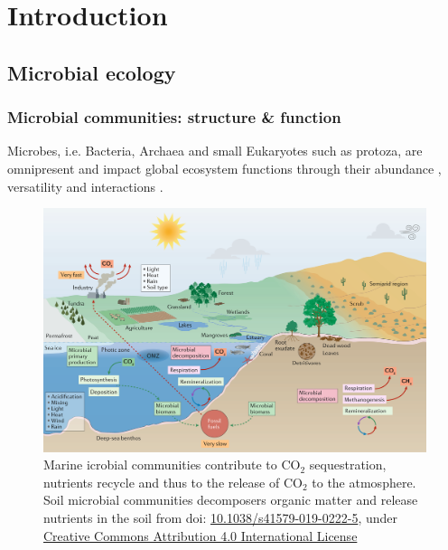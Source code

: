 \chapter{Introduction}
\label{cha:intro}


\section{Microbial ecology}

\subsection{Microbial communities: structure \& function}

   Microbes, i.e. Bacteria, Archaea and small Eukaryotes such as protoza, are omnipresent and impact global ecosystem functions \citep{falkowski2008microbial} through their abundance \citep{bar2018biomass}, versatility \citep{rees2017improving} and interactions \citep{rottjers2018hairballs}. 



   \begin{figure}[h]
      \centering
      \includegraphics[width=135mm]{figures/ecosystem_functioning.png}
      \caption{Marine icrobial communities contribute to CO$_2$ sequestration, nutrients recycle and thus to the release of CO$_2$ to the atmosphere. 
      Soil microbial communities decomposers organic matter and release nutrients in the soil 
      from \citep{cavicchioli2019scientists} doi: \href{https://doi.org/10.1038/s41579-019-0222-5}{10.1038/s41579-019-0222-5}, under \href{http://creativecommons.org/licenses/by/4.0 license}{Creative Commons Attribution 4.0 International License}
      }
   \end{figure}





